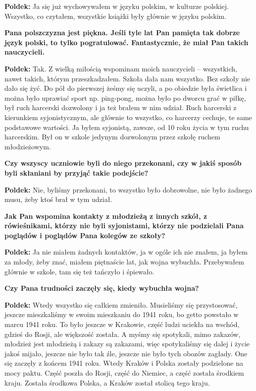 \begin{otherlanguage}{polish}
\textbf{Poldek:} Ja się już wychowywałem w języku polskim, w kulturze polskiej. Wszystko, co czytałem, wszystkie książki były głównie w języku polskim.
 
\textbf{Pana polszczyzna jest piękna. Jeśli tyle lat Pan pamięta tak dobrze język polski, to tylko pogratulować. Fantastycznie, że miał Pan takich nauczycieli.}

\sloppy
\textbf{Poldek:} Tak. Z wielką miłością wspominam moich nauczycieli – wszystkich, nawet takich, którym przeszkadzałem. Szkoła dała nam wszystko. Bez szkoły nie dało się żyć. Do pół do pierwszej żeśmy się uczyli, a po obiedzie była świetlica i można było uprawiać sport np. ping-pong, można było po dworcu grać w piłkę, był ruch harcerski dozwolony i ja też brałem w nim udział. Ruch harcerski z kierunkiem syjonistycznym, ale głównie to wszystko, co harcerzy cechuje, te same podstawowe wartości. Ja byłem syjonistą, zawsze, od 10 roku życia w tym ruchu harcerskim. Był on w szkole jedynym dozwolonym przez szkołę ruchem młodzieżowym.

\textbf{Czy wszyscy uczniowie byli do niego przekonani, czy w jakiś sposób byli skłaniani by przyjąć takie podejście?}

\textbf{Poldek:} Nie, byliśmy przekonani, to wszystko było dobrowolne, nie było żadnego musu, żeby ktoś brał w tym udział. 

\sloppy  
\textbf{Jak Pan wspomina kontakty z młodzieżą z innych szkół, z rówieśnikami, którzy nie byli syjonistami, którzy nie podzielali Pana poglądów i poglądów Pana kolegów ze szkoły?}
 
\textbf{Poldek:} Ja nie miałem żadnych kontaktów, ja w ogóle ich nie znałem, ja byłem za młody, żeby znać, miałem piętnaście lat, jak wojna wybuchła. Przebywałem głównie w szkole, tam się też tańczyło i śpiewało.

\textbf{Czy Pana trudności zaczęły się, kiedy wybuchła wojna?}

\textbf{Poldek:} Wtedy wszystko się całkiem zmieniło. Musieliśmy się przystosować, jeszcze mieszkaliśmy w swoim mieszkaniu do 1941 roku, bo getto powstało w marcu 1941 roku. To było jeszcze w Krakowie, część ludzi uciekła na wschód, gdzieś do Rosji, ale większość została. A myśmy się spotykali, mimo zakazów, młodzież jest młodzieżą i zakazy są zakazami, więc spotykaliśmy się dalej i życie jakoś mijało, jeszcze nie było tak źle, jeszcze nie było tych obozów zagłady. One się zaczęły z końcem 1941 roku. Wtedy Kraków i Polska zostały podzielone na mocy paktu. Część poszła do Rosji, część do Niemiec, a część została środkiem kraju. Została środkowa Polska, a Kraków został stolicą tego kraju. 


\end{otherlanguage}
